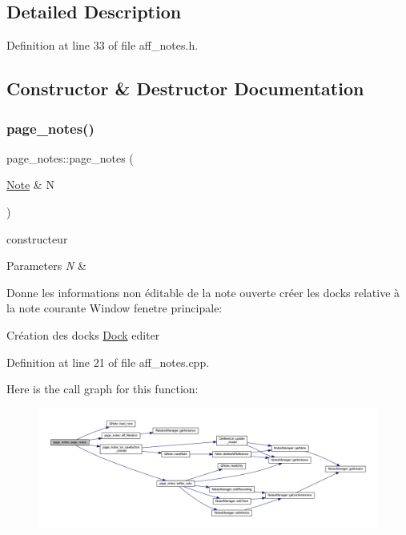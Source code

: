 \subsection{Detailed Description}


Definition at line 33 of file aff\+\_\+notes.\+h.



\subsection{Constructor \& Destructor Documentation}
\mbox{\label{classpage__notes_ad9a1b3dbe6c7901ed37a5784b1094fa6}} 
\subsubsection{\texorpdfstring{page\+\_\+notes()}{page\_notes()}}
{\footnotesize\ttfamily page\+\_\+notes\+::page\+\_\+notes (\begin{DoxyParamCaption}\item[{\hyperlink{class_note}{Note} \&}]{N }\end{DoxyParamCaption})}



constructeur 


\begin{DoxyParams}{Parameters}
{\em N} & \\
\hline
\end{DoxyParams}
Donne les informations non éditable de la note ouverte créer les docks relative à la note courante Window fenetre principale\+:

Création des docks \hyperlink{class_dock}{Dock} editer

Definition at line 21 of file aff\+\_\+notes.\+cpp.

Here is the call graph for this function\+:\nopagebreak
\begin{figure}[H]
\begin{center}
\leavevmode
\includegraphics[width=350pt]{classpage__notes_ad9a1b3dbe6c7901ed37a5784b1094fa6_cgraph}
\end{center}
\end{figure}
\mbox{\label{classpage__notes_a736d7d7d13818c43a20b20127845c6c0}} 
